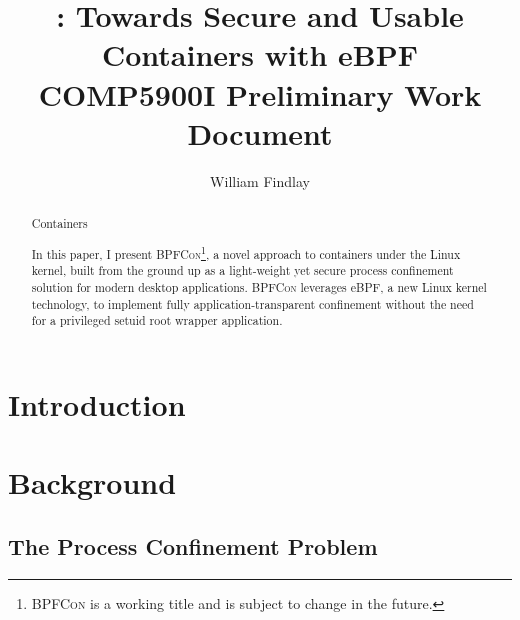 \documentclass[dvipsnames, 12pt]{article}
\title{\Large \bpfcon: Towards Secure and Usable Containers with eBPF\\{\large COMP5900I Preliminary Work Document}}
\author{William Findlay}
\def\bpfcon{\textsc{BPFCon}}
\begin{document}
\maketitle
\thispagestyle{empty}

\vfill
\begin{abstract}
\noindent
Containers 

In this paper, I present \bpfcon{}\footnote{\bpfcon{} is a working title and is
subject to change in the future.}, a novel approach to containers under the
Linux kernel, built from the ground up as a light-weight yet secure process
confinement solution for modern desktop applications. \bpfcon{} leverages eBPF,
a new Linux kernel technology, to implement fully application-transparent
confinement without the need for a privileged setuid root wrapper application.

\end{abstract}
\vfill
\vfill

\clearpage

\setcounter{page}{1}


\setcounter{page}{1}

\onehalfspacing

\section{Introduction}


\section{Background}


\subsection{The Process Confinement Problem}
\end{document}
